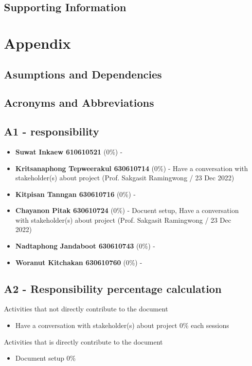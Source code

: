 \documentclass[a4paper, 10pt]{report}
\begin{document}
        \section{Supporting Information}
    \pagebreak


    \chapter{Appendix}
        \section{Asumptions and Dependencies}
        \section{Acronyms and Abbreviations}


        \section{A1 - responsibility}
        \begin{itemize}
            \item \textbf{Suwat Inkaew 610610521} (0\%) - 
            \item \textbf{Kritsanaphong Tepweerakul 630610714} (0\%) - Have a conversation with stakeholder(s) about project (Prof. Sakgasit Ramingwong / 23 Dec 2022)
            \item \textbf{Kitpisan Tanngan 630610716} (0\%) - 
            \item \textbf{Chayanon Pitak 630610724} (0\%) - Docuent setup, Have a conversation with stakeholder(s) about project (Prof. Sakgasit Ramingwong / 23 Dec 2022)
            \item \textbf{Nadtaphong Jandaboot 630610743} (0\%) - 
            \item \textbf{Woranut Kitchakan 630610760} (0\%) - 
        \end{itemize}

        \section{A2 - Responsibility percentage calculation}

        Activities that not directly contribute to the document
        \begin{itemize}
            \item Have a conversation with stakeholder(s) about project 0\% each sessions
        \end{itemize}
        \indent\indent Activities that is directly contribute to the document
        \begin{itemize}
            \item Document setup 0\%
        \end{itemize}
\end{document}
